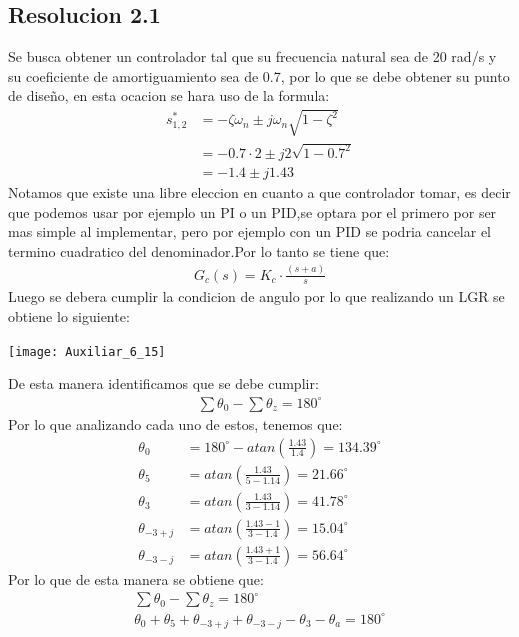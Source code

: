 \documentclass[
  11pt,
  letterpaper,
   addpoints,
   answers
  ]{exam}
\begin{document}
\begin{questions}
\begin{solution}
\subsection*{Resolucion 2.1}
Se busca obtener un controlador tal que su frecuencia natural sea de 20 rad/s y su coeficiente de amortiguamiento sea de 0.7, por lo que se debe obtener su punto de diseño, en esta ocacion se hara uso de la formula:
\begin{align}
    s_{1,2}^{*} &= -\zeta \omega_{n} \pm j\omega_{n}\sqrt{1-\zeta^{2}}\\
    &= -0.7\cdot 2 \pm j2\sqrt{1-0.7^{2}}\\
    &= -1.4 \pm j1.43
\end{align}
Notamos que existe una libre eleccion en cuanto a que controlador tomar, es decir que podemos usar por ejemplo un PI o un PID,se optara por el primero por ser mas simple al implementar, pero por ejemplo con un PID se podria cancelar el termino cuadratico del denominador.Por lo tanto se tiene que:
\begin{align}
    G_{c}(s) = K_{c}\cdot \frac{(s+a)}{s}
\end{align}
Luego se debera cumplir la condicion de angulo por lo que realizando un LGR se obtiene lo siguiente:
\begin{center}
    \texttt{[image: Auxiliar\_6\_15]}
\end{center}
De esta manera identificamos que se debe cumplir:
\begin{align}
    \sum \theta_{0} - \sum \theta_{z} = 180^{\circ}
\end{align}
Por lo que analizando cada uno de estos, tenemos que:
\begin{align}
    \theta_{0} &= 180^{\circ} - atan\left(\frac{1.43}{1.4}\right) = 134.39^{\circ}\\
    \theta_{5} &= atan\left(\frac{1.43}{5-1.14}\right) = 21.66^{\circ}\\
    \theta_{3} &= atan\left(\frac{1.43}{3-1.14}\right) = 41.78^{\circ}\\
    \theta_{-3+j} &= atan\left(\frac{1.43-1}{3-1.4}\right) = 15.04^{\circ}\\
    \theta_{-3-j} &= atan \left(\frac{1.43+1}{3-1.4}\right)= 56.64^{\circ}
\end{align}
Por lo que de esta manera se obtiene que:
\begin{align}
    \sum \theta_{0} - \sum \theta_{z} = 180^{\circ}\\
    \theta_{0} + \theta_{5} + \theta_{-3+j} + \theta_{-3-j} - \theta_{3} - \theta_{a} = 180^{\circ}\\

\end{align}
\end{solution}
\end{questions}
\end{document}
